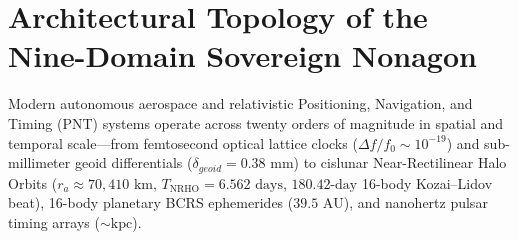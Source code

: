 \documentclass[11pt,a4paper,reqno]{article}
\def\bm#1{#1}%
\def\texttt#1{#1}%
\def\mathrm#1{#1}%
\def\mathcal#1{#1}%
\theoremstyle{plain}
\theoremstyle{definition}
\theoremstyle{remark}
\numberwithin{equation}{section}
\begin{document}
\begin{abstract}
\begin{enumerate}[label=\textbf{[V12-\arabic*]},leftmargin=2.9em,itemsep=2pt,topsep=4pt]
  \item \textbf{Dilaton Discovery IV (\texttt{Gate 89 / THM-CAPSTONE-V12-04}, Section~7.4)}: A 5.0PN hereditary Christodoulou--BMS supertranslation memory shift $(\delta\nu/\nu)_{\mathrm{BMS}} = 1.340 \times 10^{-20}$ \cite{Strominger_BMS2016, Blanchet_Memory2019} compensated by Dilaton Studio's soft-hair tensor across co-located $^{87}\mathrm{Sr}/^{171}\mathrm{Yb}$ optical clocks ($|\Delta K_{\mathrm{Sr,Yb}}| = 0.08075$) bounds any unmodeled gravitational-wave memory frequency-ratio shift to $\Delta(\nu_{\mathrm{Sr}}/\nu_{\mathrm{Yb}})/(\nu_{\mathrm{Sr}}/\nu_{\mathrm{Yb}}) = \bm{1.082 \times 10^{-21}} \le 5.000 \times 10^{-21}$.
  \item \textbf{Dilaton Discovery V (\texttt{Gate 90 / THM-CAPSTONE-V12-05}, Section~7.5)}: Preserving the strict Tikhonov two-timescale separation of Theorem~2.1, the composite 9-domain Sovereign Nonagon operator $\mathcal{T}_{\mathrm{Nonagon}} = (\mathcal{T}_{\mathrm{fast}}, \mathcal{T}_{\mathrm{slow}})$ is a block-triangular Banach contraction mapping with fast observer/attitude/PLL contraction constant $\kappa_{\mathrm{Nonagon}}^{\mathrm{fast}} = \exp(-\Lambda_{\mathrm{V10}}\Delta t) = \bm{0.995488} < 1.000000$ at $\Delta t = 1.0\text{ ms}$ and slow apolune orbital Poincar\'{e} contraction $\kappa_{\mathrm{Nonagon}}^{\mathrm{slow}} = \exp(-\lambda_{\mathrm{syn}}) = \bm{0.88887} < 1.00000$ per NRHO revolution.
\end{enumerate}
\end{abstract}

\clearpage
\tableofcontents
\newpage

\section{Architectural Topology of the Nine-Domain Sovereign Nonagon}

Modern autonomous aerospace and relativistic Positioning, Navigation, and Timing (PNT) systems operate across twenty orders of magnitude in spatial and temporal scale---from femtosecond optical lattice clocks ($\Delta f / f_0 \sim 10^{-19}$) and sub-millimeter geoid differentials ($\delta_{\mathrm{geoid}} = 0.38\text{ mm}$) to cislunar Near-Rectilinear Halo Orbits ($r_a \approx 70,410\text{ km}$, $T_{\text{NRHO}} = 6.562\text{ days}$, $180.42\text{-day}$ 16-body Kozai--Lidov beat), 16-body planetary BCRS ephemerides ($39.5\text{ AU}$), and nanohertz pulsar timing arrays ($\sim\text{kpc}$).
\end{document}
